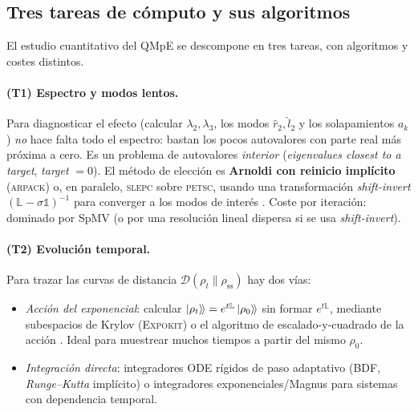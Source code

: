 \documentclass[11pt,a4paper]{article}
\theoremstyle{definition}
\theoremstyle{plain}
\newcommand{\Dop}{\mathcal{D}}
\newcommand{\rss}{\rho_{\mathrm{ss}}}
\begin{document}
\subsection{Tres tareas de cómputo y sus algoritmos}

El estudio cuantitativo del QMpE se descompone en tres tareas, con algoritmos y costes distintos.

\paragraph{(T1) Espectro y modos lentos.}
Para diagnosticar el efecto (calcular $\lambda_2,\lambda_3$, los modos $\hat r_2,\hat l_2$ y los
solapamientos $a_k$) \emph{no} hace falta todo el espectro: bastan los pocos autovalores con parte real más
próxima a cero. Es un problema de autovalores \emph{interior} (\emph{eigenvalues closest to a target},
\emph{target} $=0$). El método de elección es \textbf{Arnoldi con reinicio implícito}
(\textsc{arpack}) o, en paralelo, \textsc{slepc} sobre \textsc{petsc}, usando una transformación
\emph{shift-invert} $(\mathbb{L}-\sigma\mathbb{1})^{-1}$ para converger a los modos de interés
\cite{Lehoucq1998,Hernandez2005,Balay2023,Minganti2018}. Coste por iteración: dominado por SpMV (o por una
resolución lineal dispersa si se usa \emph{shift-invert}).

\paragraph{(T2) Evolución temporal.}
Para trazar las curvas de distancia $\Dop(\rho_t\|\rss)$ hay dos vías:
\begin{itemize}[leftmargin=1.6em,itemsep=2pt]
\item \emph{Acción del exponencial}: calcular $\ket{\rho_t}\!\rangle=e^{t\mathbb{L}}\ket{\rho_0}\!\rangle$
sin formar $e^{t\mathbb{L}}$, mediante subespacios de Krylov (\textsc{Expokit}) o el algoritmo de
escalado-y-cuadrado de la acción \cite{Sidje1998,AlMohyHigham2011}. Ideal para muestrear muchos
tiempos a partir del mismo $\rho_0$.
\item \emph{Integración directa}: integradores ODE rígidos de paso adaptativo (BDF, \emph{Runge--Kutta}
implícito) o integradores exponenciales/Magnus para sistemas con dependencia temporal.
\end{itemize}
\end{document}
